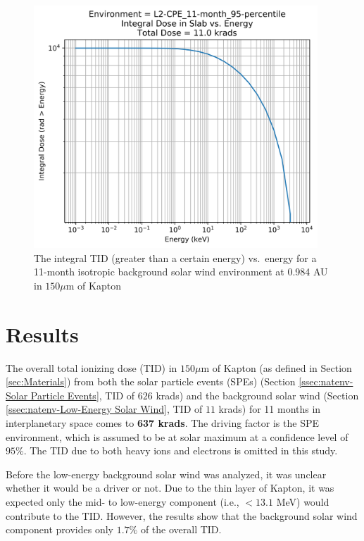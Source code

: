 \documentclass{hitec}
\begin{document}
\begin{figure}[htbp!]
	\centering
	\includegraphics[width=0.95\textwidth]{../L2-CPE_11-month_95-percentile_Integral_Dose_vs_Energy.png}
	\caption{The integral TID (greater than a certain energy) vs.\ energy for a 11-month isotropic background solar wind environment at 0.984 AU in $150 \mu$m of Kapton}\label{fig:L2-CPE_11-month_95-percentile_Integral_Dose_vs_Energy}
\end{figure}

\clearpage %

\section{Results}

The overall total ionizing dose (TID) in $150\mu$m of Kapton (as defined in Section \ref{sec:Materials}) from both the solar particle events (SPEs) (Section \ref{ssec:natenv-Solar Particle Events}, TID of $626$ krads) and the background solar wind (Section \ref{ssec:natenv-Low-Energy Solar Wind}, TID of $11$ krads) for 11 months in interplanetary space comes to \textbf{637 krads}. The driving factor is the SPE environment, which is assumed to be at solar maximum at a confidence level of $95\%$. The TID due to both heavy ions and electrons is omitted in this study.

Before the low-energy background solar wind was analyzed, it was unclear whether it would be a driver or not. Due to the thin layer of Kapton, it was expected only the mid- to low-energy component (i.e., $< 13.1$ MeV) would contribute to the TID. However, the results show that the background solar wind component provides only $1.7\%$ of the overall TID.
\end{document}
